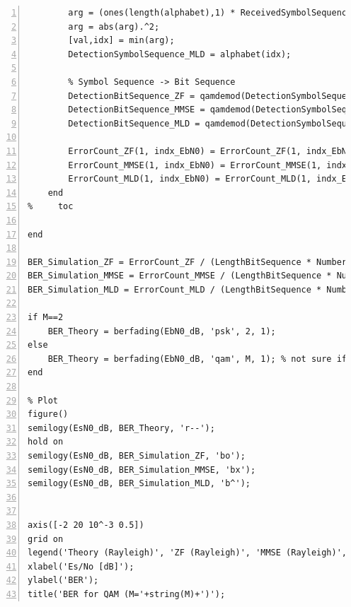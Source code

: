 \documentclass{article}
\begin{document}
\begin{lstlisting}[style=Matlab-editor, frame=single, numbers=left,]
        % MLD Receiver;
        arg = (ones(length(alphabet),1) * ReceivedSymbolSequence) - (alphabet.' * H);
        arg = abs(arg).^2;
        [val,idx] = min(arg);
        DetectionSymbolSequence_MLD = alphabet(idx);

        % Symbol Sequence -> Bit Sequence
        DetectionBitSequence_ZF = qamdemod(DetectionSymbolSequence_ZF.', M, 'OutputType', 'bit', 'UnitAveragePower', 1)'; % Detection
        DetectionBitSequence_MMSE = qamdemod(DetectionSymbolSequence_MMSE.', M, 'OutputType', 'bit', 'UnitAveragePower', 1)'; % tmp value;
        DetectionBitSequence_MLD = qamdemod(DetectionSymbolSequence_MLD.', M, 'OutputType', 'bit', 'UnitAveragePower', 1)';

        ErrorCount_ZF(1, indx_EbN0) = ErrorCount_ZF(1, indx_EbN0) + sum(DetectionBitSequence_ZF~=BitSequence);
        ErrorCount_MMSE(1, indx_EbN0) = ErrorCount_MMSE(1, indx_EbN0) + sum(DetectionBitSequence_MMSE~=BitSequence);
        ErrorCount_MLD(1, indx_EbN0) = ErrorCount_MLD(1, indx_EbN0) + sum(DetectionBitSequence_MLD~=BitSequence);
    end
%     toc
    
end

BER_Simulation_ZF = ErrorCount_ZF / (LengthBitSequence * NumberIteration);
BER_Simulation_MMSE = ErrorCount_MMSE / (LengthBitSequence * NumberIteration);
BER_Simulation_MLD = ErrorCount_MLD / (LengthBitSequence * NumberIteration);

if M==2
    BER_Theory = berfading(EbN0_dB, 'psk', 2, 1);
else
    BER_Theory = berfading(EbN0_dB, 'qam', M, 1); % not sure if 'dataenc' needs to be specified; I don't even know what it does
end

% Plot
figure()
semilogy(EsN0_dB, BER_Theory, 'r--');
hold on
semilogy(EsN0_dB, BER_Simulation_ZF, 'bo');
semilogy(EsN0_dB, BER_Simulation_MMSE, 'bx');
semilogy(EsN0_dB, BER_Simulation_MLD, 'b^');


axis([-2 20 10^-3 0.5])
grid on
legend('Theory (Rayleigh)', 'ZF (Rayleigh)', 'MMSE (Rayleigh)', 'MLD (Rayleigh)');
xlabel('Es/No [dB]');
ylabel('BER');
title('BER for QAM (M='+string(M)+')');
\end{lstlisting}
\end{document}

